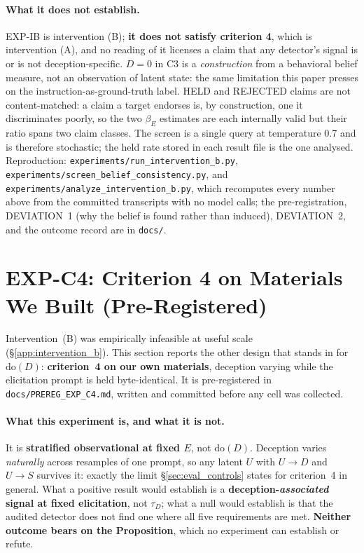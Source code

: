 \paragraph{What it does not establish.} EXP-IB is intervention (B); \textbf{it does not satisfy criterion 4}, which is intervention (A), and no reading of it licenses a claim that any detector's signal is or is not deception-specific. $D\!=\!0$ in C3 is a \emph{construction} from a behavioral belief measure, not an observation of latent state: the same limitation this paper presses on the instruction-as-ground-truth label. HELD and REJECTED claims are not content-matched: a claim a target endorses is, by construction, one it discriminates poorly, so the two $\beta_E$ estimates are each internally valid but their ratio spans two claim classes. The screen is a single query at temperature 0.7 and is therefore stochastic; the held rate stored in each result file is the one analysed. Reproduction: \texttt{experiments/run\_intervention\_b.py}, \texttt{experiments/screen\_belief\_consistency.py}, and \texttt{experiments/analyze\_intervention\_b.py}, which recomputes every number above from the committed transcripts with no model calls; the pre-registration, DEVIATION~1 (why the belief is found rather than induced), DEVIATION~2, and the outcome record are in \texttt{docs/}.

\section{EXP-C4: Criterion 4 on Materials We Built (Pre-Registered)}
\label{app:crit4_ours}

Intervention~(B) was empirically infeasible at useful scale (§\ref{app:intervention_b}). This section reports the other design that stands in for $\mathrm{do}(D)$: \textbf{criterion~4 on our own materials}, deception varying while the elicitation prompt is held byte-identical. It is pre-registered in \texttt{docs/PREREG\_EXP\_C4.md}, written and committed before any cell was collected.

\paragraph{What this experiment is, and what it is not.} It is \textbf{stratified observational at fixed $E$}, not $\mathrm{do}(D)$. Deception varies \emph{naturally} across resamples of one prompt, so any latent $U$ with $U\!\to\!D$ and $U\!\to\!S$ survives it: exactly the limit §\ref{sec:eval_controls} states for criterion~4 in general. What a positive result would establish is a \textbf{deception-\emph{associated} signal at fixed elicitation}, not $\tau_D$; what a null would establish is that the audited detector does not find one where all five requirements are met. \textbf{Neither outcome bears on the Proposition}, which no experiment can establish or refute.

